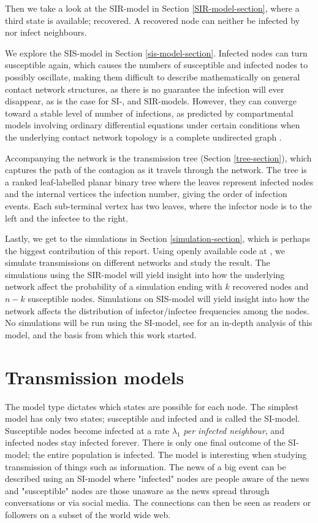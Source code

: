 \documentclass[12pt]{article} %
\numberwithin{equation}{section}
\begin{document}
Then we take a look at the SIR-model in Section \ref{SIR-model-section}, where a third state is available; recovered. A recovered node can neither be infected by nor infect neighbours.

We explore the SIS-model in Section \ref{sis-model-section}. Infected nodes can turn susceptible again, which causes the numbers of susceptible and infected nodes to possibly oscillate, making them difficult to describe mathematically on general contact network structures, as there is no guarantee the infection will ever disappear, as is the case for SI-, and SIR-models. However, they can converge toward a stable level of number of infections, as predicted by compartmental models involving ordinary differential equations under certain conditions when the underlying contact network topology is a complete undirected graph \cite{hethcote1989three}.

Accompanying the network is the transmission tree (Section \ref{tree-section}), which captures the path of the contagion as it travels through the network. The tree is a ranked leaf-labelled planar binary tree where the leaves represent infected nodes and the internal vertices the infection number, giving the order of infection events. Each sub-terminal vertex has two leaves, where the infector node is to the left and the infectee to the right. 

Lastly, we get to the simulations in Section \ref{simulation-section}, which is perhaps the biggest contribution of this report. Using openly available code at \cite{github}, we simulate transmissions on different networks and study the result. The simulations using the SIR-model will yield insight into how the underlying network affect the probability of a simulation ending with $k$ recovered nodes and $n-k$ susceptible nodes. Simulations on SIS-model will yield insight into how the network affects the distribution of infector/infectee frequencies among the nodes. No simulations will be run using the SI-model, see \cite{sainudiin2016transmission} for an in-depth analysis of this model, and the basis from which this work started.

\section{Transmission models}\label{section1}

The model type dictates which states are possible for each node. The simplest model has only two states; susceptible and infected and is called the SI-model. Susceptible nodes become infected at a rate $\lambda_1$ \textit{per infected neighbour}, and infected nodes stay infected forever. There is only one final outcome of the SI-model; the entire population is infected. The model is interesting when studying transmission of things such as information. The news of a big event can be described using an SI-model where "infected" nodes are people aware of the news and "susceptible" nodes are those unaware as the news spread through conversations or via social media. The connections can then be seen as readers or followers on a subset of the world wide web.
\end{document}
